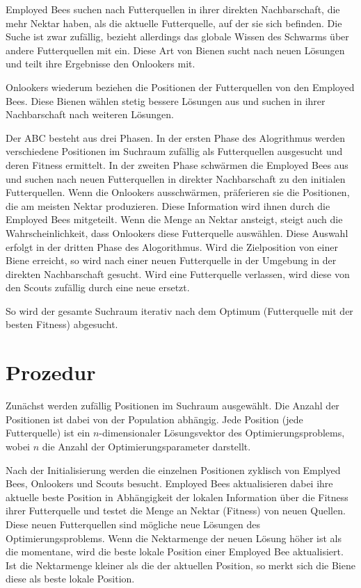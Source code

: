 Employed Bees suchen nach Futterquellen in ihrer direkten Nachbarschaft, die
mehr Nektar haben, als die aktuelle Futterquelle, auf der sie sich befinden.
Die Suche ist zwar zufällig, bezieht allerdings das globale Wissen des
Schwarms über andere Futterquellen mit ein. Diese Art von Bienen sucht nach
neuen Lösungen und teilt ihre Ergebnisse den Onlookers mit.

Onlookers wiederum beziehen die Positionen der Futterquellen von den
Employed Bees. Diese Bienen wählen stetig bessere Lösungen aus und suchen in
ihrer Nachbarschaft nach weiteren Lösungen.

Der ABC besteht aus drei Phasen. In der ersten Phase des Alogrithmus werden
verschiedene Positionen im Suchraum zufällig als Futterquellen ausgesucht und
deren Fitness ermittelt.
In der zweiten Phase schwärmen die Employed Bees aus und suchen nach neuen
Futterquellen in direkter Nachbarschaft zu den initialen Futterquellen.
Wenn die Onlookers ausschwärmen, präferieren sie die Positionen, die
am meisten Nektar produzieren. Diese Information wird ihnen durch die
Employed Bees mitgeteilt. Wenn die Menge an Nektar ansteigt, steigt auch
die Wahrscheinlichkeit, dass Onlookers diese Futterquelle auswählen. Diese
Auswahl erfolgt in der dritten Phase des Alogorithmus.
Wird die Zielposition von einer Biene erreicht, so wird nach einer neuen
Futterquelle in der Umgebung in der direkten Nachbarschaft gesucht.
Wird eine Futterquelle verlassen, wird diese von den Scouts zufällig durch
eine neue ersetzt.

So wird der gesamte Suchraum iterativ nach dem Optimum (Futterquelle mit der
besten Fitness) abgesucht.

\section{Prozedur}

Zunächst werden zufällig Positionen im Suchraum ausgewählt. Die Anzahl der
Positionen ist dabei von der Population abhängig. Jede Position (jede
Futterquelle) ist ein $n$-dimensionaler Lösungsvektor des
Optimierungsproblems, wobei $n$ die Anzahl der Optimierungsparameter
darstellt.

Nach der Initialisierung werden die einzelnen Positionen zyklisch von
Emplyed Bees, Onlookers und Scouts besucht. Employed Bees aktualisieren
dabei ihre aktuelle beste Position in Abhängigkeit der lokalen Information
über die Fitness ihrer Futterquelle und testet die Menge an Nektar
(Fitness) von neuen Quellen. Diese neuen Futterquellen sind mögliche neue
Lösungen des Optimierungsproblems.
Wenn die Nektarmenge der neuen Lösung höher ist als die momentane, wird die
beste lokale Position einer Employed Bee aktualisiert. Ist die Nektarmenge
kleiner als die der aktuellen Position, so merkt sich die Biene diese als
beste lokale Position.

